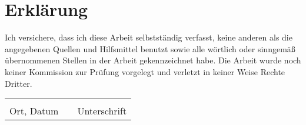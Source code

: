 \chapter*{Erklärung}

Ich versichere, dass ich diese Arbeit selbstständig verfasst, keine anderen als die angegebenen Quellen und Hilfsmittel benutzt sowie alle wörtlich oder sinngemäß übernommenen Stellen in der Arbeit gekennzeichnet habe. Die Arbeit wurde noch keiner Kommission zur Prüfung vorgelegt und verletzt in keiner Weise Rechte Dritter.

\vspace{5cm}





\begin{tabular}{lp{2em}l} 
	\hspace{8cm}   && \hspace{4cm} \\\cline{1-1}\cline{3-3} 
	Ort, Datum     && Unterschrift 
\end{tabular} 
